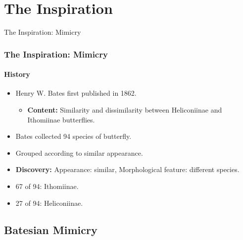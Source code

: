 \section{The Inspiration}

\frame
{
	\begin{center}
		\LARGE The Inspiration: Mimicry
	\end{center}
}

\frame
{
	\frametitle{The Inspiration: Mimicry}
	\framesubtitle{History}
	
	\begin{itemize}
		\item Henry W. Bates first published in 1862.
			\begin{itemize}
				\item \textbf{Content:} Similarity and dissimilarity between Heliconiinae and Ithomiinae butterflies. 
			\end{itemize}
		\item Bates collected 94 species of butterfly.
		\item Grouped according to similar appearance.
		\item \textbf{Discovery:} Appearance: similar, Morphological feature: different species.
		\item 67 of 94: Ithomiinae.
		\item 27 of 94: Heliconiinae.
	\end{itemize}
}

\subsection{Batesian Mimicry}

